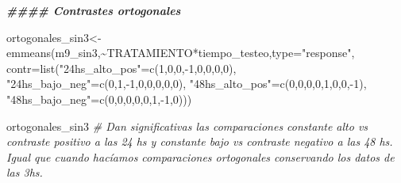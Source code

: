 \documentclass[
]{article}
\newenvironment{Shaded}{\begin{snugshade}}{\end{snugshade}}
\newcommand{\AttributeTok}[1]{\textcolor[rgb]{0.77,0.63,0.00}{#1}}
\newcommand{\CommentTok}[1]{\textcolor[rgb]{0.56,0.35,0.01}{\textit{#1}}}
\newcommand{\DecValTok}[1]{\textcolor[rgb]{0.00,0.00,0.81}{#1}}
\newcommand{\DocumentationTok}[1]{\textcolor[rgb]{0.56,0.35,0.01}{\textbf{\textit{#1}}}}
\newcommand{\FunctionTok}[1]{\textcolor[rgb]{0.00,0.00,0.00}{#1}}
\newcommand{\NormalTok}[1]{#1}
\newcommand{\OtherTok}[1]{\textcolor[rgb]{0.56,0.35,0.01}{#1}}
\newcommand{\SpecialCharTok}[1]{\textcolor[rgb]{0.00,0.00,0.00}{#1}}
\newcommand{\StringTok}[1]{\textcolor[rgb]{0.31,0.60,0.02}{#1}}
\begin{document}
\begin{Shaded}
\begin{Highlighting}[]
\DocumentationTok{\#\#\#\# Contrastes ortogonales}

\NormalTok{ortogonales\_sin3}\OtherTok{\textless{}{-}}\FunctionTok{emmeans}\NormalTok{(m9\_sin3,}\SpecialCharTok{\textasciitilde{}}\NormalTok{TRATAMIENTO}\SpecialCharTok{*}\NormalTok{tiempo\_testeo,}\AttributeTok{type=}\StringTok{"response"}\NormalTok{,}
                \AttributeTok{contr=}\FunctionTok{list}\NormalTok{(}\StringTok{"24hs\_alto\_pos"}\OtherTok{=}\FunctionTok{c}\NormalTok{(}\DecValTok{1}\NormalTok{,}\DecValTok{0}\NormalTok{,}\DecValTok{0}\NormalTok{,}\SpecialCharTok{{-}}\DecValTok{1}\NormalTok{,}\DecValTok{0}\NormalTok{,}\DecValTok{0}\NormalTok{,}\DecValTok{0}\NormalTok{,}\DecValTok{0}\NormalTok{), }
                     \StringTok{"24hs\_bajo\_neg"}\OtherTok{=}\FunctionTok{c}\NormalTok{(}\DecValTok{0}\NormalTok{,}\DecValTok{1}\NormalTok{,}\SpecialCharTok{{-}}\DecValTok{1}\NormalTok{,}\DecValTok{0}\NormalTok{,}\DecValTok{0}\NormalTok{,}\DecValTok{0}\NormalTok{,}\DecValTok{0}\NormalTok{,}\DecValTok{0}\NormalTok{), }
                     \StringTok{"48hs\_alto\_pos"}\OtherTok{=}\FunctionTok{c}\NormalTok{(}\DecValTok{0}\NormalTok{,}\DecValTok{0}\NormalTok{,}\DecValTok{0}\NormalTok{,}\DecValTok{0}\NormalTok{,}\DecValTok{1}\NormalTok{,}\DecValTok{0}\NormalTok{,}\DecValTok{0}\NormalTok{,}\SpecialCharTok{{-}}\DecValTok{1}\NormalTok{), }
                     \StringTok{"48hs\_bajo\_neg"}\OtherTok{=}\FunctionTok{c}\NormalTok{(}\DecValTok{0}\NormalTok{,}\DecValTok{0}\NormalTok{,}\DecValTok{0}\NormalTok{,}\DecValTok{0}\NormalTok{,}\DecValTok{0}\NormalTok{,}\DecValTok{1}\NormalTok{,}\SpecialCharTok{{-}}\DecValTok{1}\NormalTok{,}\DecValTok{0}\NormalTok{)))}

\NormalTok{ortogonales\_sin3 }\CommentTok{\# Dan significativas las comparaciones constante alto vs contraste positivo a las 24 hs y constante bajo vs contraste negativo a las 48 hs. Igual que cuando hacíamos comparaciones ortogonales conservando los datos de las 3hs.}
\end{Highlighting}
\end{Shaded}
\end{document}
